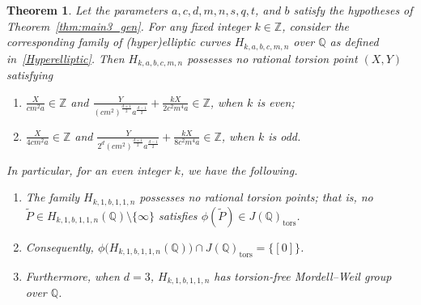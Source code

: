 \documentclass[11pt,a4paper]{amsart}
\newcommand{\ZZ}{\mathbb{Z}}
\newcommand{\Q}{\mathbb{Q}}
\theoremstyle{plain}
\newtheorem{theorem}{Theorem}[section]
\theoremstyle{definition}
\begin{document}
\begin{theorem} \label{thm:general-3c-hyperelliptic}
Let the parameters $a, c, d, m, n, s, q, t$, and $b$ satisfy the hypotheses of Theorem~\ref{thm:main3_gen}. For any fixed integer $k \in \ZZ$, consider the corresponding family of (hyper)elliptic curves $H_{k,a,b,c,m,n}$ over $\Q$ as defined in~\eqref{Hyperelliptic}. Then $H_{k,a,b,c,m,n}$ possesses no rational torsion point $(X,Y)$ satisfying
\begin{enumerate}[label=(\alph*)]
    \item $\frac{X}{cm^2a}\in \ZZ$ and $\frac{Y}{(cm^2)^{\frac{d+1}{2}}a^{\frac{d-1}{2}}} + \frac{kX}{2c^2m^4a}\in \ZZ$, when $k$ is even;\label{Cond: 1}
    \item $\frac{X}{4cm^2a}\in \ZZ$ and $\frac{Y}{2^d(cm^2)^{\frac{d+1}{2}}a^{\frac{d-1}{2}}} + \frac{kX}{8c^2m^4a}\in \ZZ$, when $k$ is odd.\label{Cond: 2}
\end{enumerate}
In particular, for an even integer $k$, we have the following.
\begin{enumerate}[label=(\roman*)]
    \item The family $H_{k,1,b,1,1,n}$ possesses no rational torsion points; that is, no $\widetilde{P}\in H_{k,1,b,1,1,n}(\Q)\setminus\{\infty\}$ satisfies $\phi(\widetilde{P})\in J(\Q)_{\mathrm{tors}}$.\label{HyperCond: 1}
    \item Consequently, $\phi\big(H_{k,1,b,1,1,n}(\Q)\big) \cap J(\Q)_{\mathrm{tors}}=\{[0]\}$.\label{HyperCond: 2}
    \item Furthermore, when $d=3$, $H_{k,1,b,1,1,n}$ has torsion-free Mordell--Weil group over $\Q$.\label{HyperCond: 3}
\end{enumerate}
\end{theorem}
\end{document}
